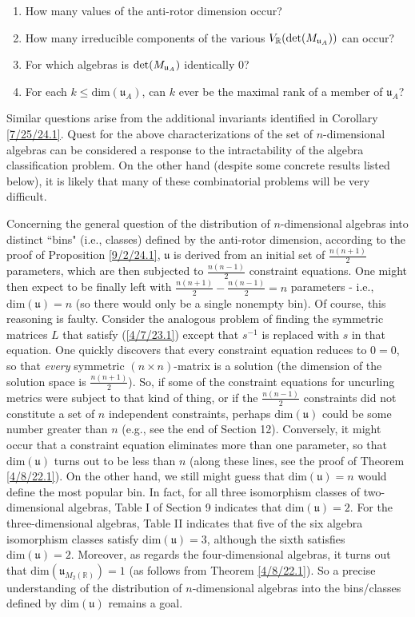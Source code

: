 \documentclass{amsart}
\numberwithin{equation}{section}
\theoremstyle{definition}
\numberwithin{theorem}{section}
\begin{document}
\begin{enumerate} \item How many values of the anti-rotor dimension occur?  \item How many irreducible components of the various $V_\mathbb{R}({\rm det}(M_{\mathfrak{u}_A}))$ can occur?  \item For which algebras is ${\rm det}(M_{\mathfrak{u}_A})$ identically $0$?  \item For each $k\le \text{dim}(\mathfrak{u}_A)$, can $k$ ever be the maximal rank of a member of $\mathfrak{u}_A$?   \end{enumerate}  
Similar questions arise from the additional invariants identified in Corollary \ref{7/25/24.1}.  Quest for the above characterizations of the set of $n$-dimensional algebras can be considered a response to the intractability of the algebra classification problem.  On the other hand (despite some concrete results listed below), it is likely that many of these combinatorial problems will be very difficult.

Concerning the general question of the distribution of $n$-dimensional algebras into distinct ``bins" (i.e., classes) defined by the anti-rotor dimension, according to the proof of Proposition \ref{9/2/24.1}, $\mathfrak{u}$ is derived from an initial set of $\frac{n(n+1)}{2}$ parameters, which are then subjected to  $\frac{n(n-1)}{2}$ constraint equations.  One might then expect to be finally left with $\frac{n(n+1)}{2} - \frac{n(n-1)}{2} = n$ parameters - i.e., $\text{dim}(\mathfrak{u}) = n$ (so there would only be a single nonempty bin).  Of course, this reasoning is faulty.  Consider the analogous problem of finding the symmetric matrices $L$ that satisfy (\ref{4/7/23.1}) except that $s^{-1}$ is replaced with $s$ in that equation.  One quickly discovers that every constraint equation reduces to $0=0$, so that {\it every} symmetric $(n\times n)$-matrix is a solution (the dimension of the solution space is $\frac{n(n+1)}{2}$).  So, if some of the constraint equations for uncurling metrics were subject to  that kind of thing, or if the $\frac{n(n-1)}{2}$ constraints did not constitute a set of $n$ independent constraints, perhaps $\text{dim}(\mathfrak{u})$ could be some number greater than $n$ (e.g., see the end of Section 12).  Conversely, it might occur that a constraint equation eliminates more than one parameter, so that $\text{dim}(\mathfrak{u})$ turns out to be less than $n$ (along these lines, see the proof of Theorem \ref{4/8/22.1}).  On the other hand, we still might guess that $\text{dim}(\mathfrak{u}) = n$ would define the most popular bin.  In fact, for all three isomorphism classes of two-dimensional algebras, Table I of Section 9 indicates that \mbox{$\text{dim}(\mathfrak{u}) = 2$}.  For the three-dimensional algebras, Table II indicates that five of the six algebra isomorphism classes satisfy $\text{dim}(\mathfrak{u}) = 3$, although the sixth satisfies $\text{dim}(\mathfrak{u}) = 2$.  Moreover, as regards the four-dimensional algebras, it turns out that $\text{dim}(\mathfrak{u}_{M_2(\mathbb{R})}) = 1$ (as follows from Theorem \ref{4/8/22.1}). So a precise understanding of the distribution of $n$-dimensional algebras into the bins/classes defined by $\text{dim}(\mathfrak{u})$ remains a goal.  
\end{document}
